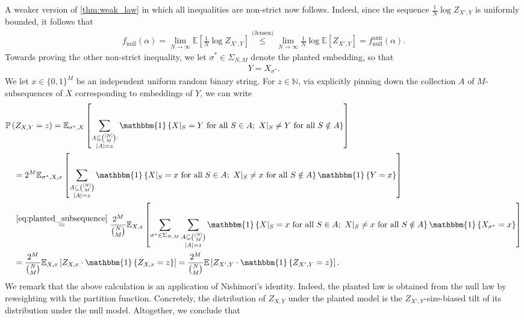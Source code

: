 \documentclass[11pt]{amsart}
\numberwithin{equation}{section}
\numberwithin{equation}{section}
\newcommand{\1}{\mathbbm{1}}
\newcommand{\E}{\mathbb{E}}
\newcommand{\Prob}{\mathbb{P}}
\newcommand{\N}{\mathbb{N}}
\newcommand{\fnull}{f_{\mathrm{null}}}
\newcommand{\fnullann}{f_{\mathrm{null}}^{\mathrm{ann}}}
\theoremstyle{definition}
\newenvironment{remark}
  {\pushQED{\qed}\renewcommand{\qedsymbol}{$\triangle$}\remarkx}
  {\popQED\endremarkx}
\begin{document}
\begin{remark}
    A weaker version of \cref{thm:weak_law} in which all inequalities are non-strict now follows. Indeed, since the sequence $\frac{1}{N} \log Z_{X',Y}$ is uniformly bounded, it follows that
    \begin{align} \label{eq:null_jensen}
        \fnull(\alpha) = \lim_{N \to \infty} \E\left[ \frac{1}{N} \log Z_{X',Y} \right] \stackrel{\text{(Jensen)}}{\leq} \lim_{N \to \infty} \frac{1}{N}  \log \E\left[ Z_{X',Y} \right] = \fnullann(\alpha).
    \end{align}
    Towards proving the other non-strict inequality, we let $\sigma^* \in \Sigma_{N,M}$ denote the planted embedding, so that
    \begin{align} \label{eq:planted_subsequence}
        Y = X_{\sigma^*}.
    \end{align}
    We let $x \in \{0,1\}^M$ be an independent uniform random binary string. For $z \in \N$, via explicitly pinning down the collection $A$ of $M$-subsequences of $X$ corresponding to embeddings of $Y$, we can write
    \begin{align}
        & \Prob\left( Z_{X,Y} = z \right) = \E_{\sigma^*,X} \left[ \sum_{\substack{A \subseteq \binom{[N]}{M}: \\ |A| = z}} \1\left\{ X|_S = Y \ \text{for all} \ S \in A; \ X|_S \neq Y \ \text{for all} \ S \notin A \right\} \right] \nonumber \\
        & \quad = 2^M \E_{\sigma^*, X, x} \left[ \sum_{\substack{A \subseteq \binom{[N]}{M} \\ |A| = z}} \1\left\{ X|_S = x \ \text{for all} \ S \in A; \ X|_S \neq x \ \text{for all} \ S \notin A \right\} \1\left\{ Y = x \right\} \right] \nonumber \\
        & \quad \stackrel{\eqref{eq:planted_subsequence}}{=} \frac{2^M}{\binom{N}{M}} \E_{X, x} \left[ \sum_{\sigma^* \in \Sigma_{N,M}} \sum_{\substack{A \subseteq \binom{[N]}{M} \\ |A| = z}} \1\left\{ X|_S = x \ \text{for all} \ S \in A; \ X|_S \neq x \ \text{for all} \ S \notin A \right\} \1\left\{ X_{\sigma^*} = x \right\} \right] \nonumber \\
        & \quad = \frac{2^M}{\binom{N}{M}} \E_{X, x} \left[ Z_{X,x} \cdot \1\left\{Z_{X,x} = z \right\} \right] = \frac{2^M}{\binom{N}{M}} \E\left[ Z_{X',Y} \cdot \1\left\{Z_{X',Y} = z \right\} \right]. \label{eq:planted_point_prob}
    \end{align}
    We remark that the above calculation is an application of Nishimori's identity. Indeed, the planted law is obtained from the null law by reweighting with the partition function. Concretely, the distribution of $Z_{X,Y}$ under the planted model is the $Z_{X',Y}$-size-biased tilt of its distribution under the null model. Altogether, we conclude that

\end{remark}
\end{document}
